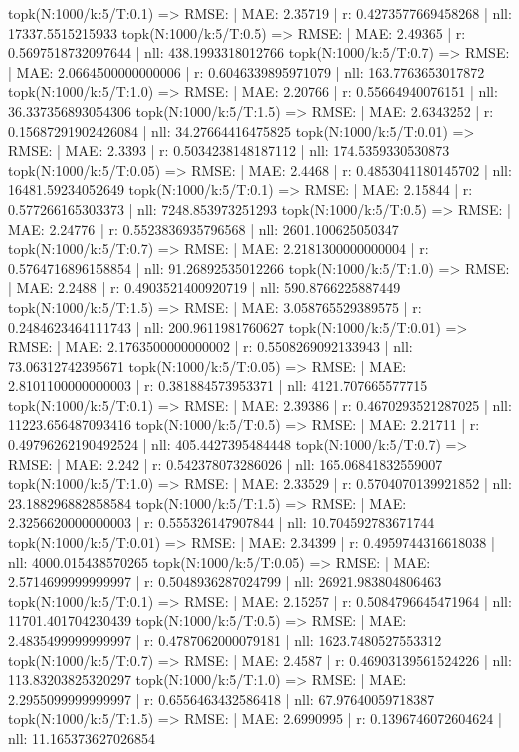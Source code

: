topk(N:1000/k:5/T:0.1) => RMSE: | MAE: 2.35719 | r: 0.4273577669458268 | nll: 17337.5515215933
topk(N:1000/k:5/T:0.5) => RMSE: | MAE: 2.49365 | r: 0.5697518732097644 | nll: 438.1993318012766
topk(N:1000/k:5/T:0.7) => RMSE: | MAE: 2.0664500000000006 | r: 0.6046339895971079 | nll: 163.7763653017872
topk(N:1000/k:5/T:1.0) => RMSE: | MAE: 2.20766 | r: 0.55664940076151 | nll: 36.337356893054306
topk(N:1000/k:5/T:1.5) => RMSE: | MAE: 2.6343252 | r: 0.15687291902426084 | nll: 34.27664416475825
topk(N:1000/k:5/T:0.01) => RMSE: | MAE: 2.3393 | r: 0.5034238148187112 | nll: 174.5359330530873
topk(N:1000/k:5/T:0.05) => RMSE: | MAE: 2.4468 | r: 0.4853041180145702 | nll: 16481.59234052649
topk(N:1000/k:5/T:0.1) => RMSE: | MAE: 2.15844 | r: 0.577266165303373 | nll: 7248.853973251293
topk(N:1000/k:5/T:0.5) => RMSE: | MAE: 2.24776 | r: 0.5523836935796568 | nll: 2601.100625050347
topk(N:1000/k:5/T:0.7) => RMSE: | MAE: 2.2181300000000004 | r: 0.5764716896158854 | nll: 91.26892535012266
topk(N:1000/k:5/T:1.0) => RMSE: | MAE: 2.2488 | r: 0.4903521400920719 | nll: 590.8766225887449
topk(N:1000/k:5/T:1.5) => RMSE: | MAE: 3.058765529389575 | r: 0.2484623464111743 | nll: 200.9611981760627
topk(N:1000/k:5/T:0.01) => RMSE: | MAE: 2.1763500000000002 | r: 0.5508269092133943 | nll: 73.06312742395671
topk(N:1000/k:5/T:0.05) => RMSE: | MAE: 2.8101100000000003 | r: 0.381884573953371 | nll: 4121.707665577715
topk(N:1000/k:5/T:0.1) => RMSE: | MAE: 2.39386 | r: 0.4670293521287025 | nll: 11223.656487093416
topk(N:1000/k:5/T:0.5) => RMSE: | MAE: 2.21711 | r: 0.49796262190492524 | nll: 405.4427395484448
topk(N:1000/k:5/T:0.7) => RMSE: | MAE: 2.242 | r: 0.542378073286026 | nll: 165.06841832559007
topk(N:1000/k:5/T:1.0) => RMSE: | MAE: 2.33529 | r: 0.5704070139921852 | nll: 23.188296882858584
topk(N:1000/k:5/T:1.5) => RMSE: | MAE: 2.3256620000000003 | r: 0.555326147907844 | nll: 10.704592783671744
topk(N:1000/k:5/T:0.01) => RMSE: | MAE: 2.34399 | r: 0.4959744316618038 | nll: 4000.015438570265
topk(N:1000/k:5/T:0.05) => RMSE: | MAE: 2.5714699999999997 | r: 0.5048936287024799 | nll: 26921.983804806463
topk(N:1000/k:5/T:0.1) => RMSE: | MAE: 2.15257 | r: 0.5084796645471964 | nll: 11701.401704230439
topk(N:1000/k:5/T:0.5) => RMSE: | MAE: 2.4835499999999997 | r: 0.4787062000079181 | nll: 1623.7480527553312
topk(N:1000/k:5/T:0.7) => RMSE: | MAE: 2.4587 | r: 0.46903139561524226 | nll: 113.83203825320297
topk(N:1000/k:5/T:1.0) => RMSE: | MAE: 2.2955099999999997 | r: 0.6556463432586418 | nll: 67.97640059718387
topk(N:1000/k:5/T:1.5) => RMSE: | MAE: 2.6990995 | r: 0.1396746072604624 | nll: 11.165373627026854
